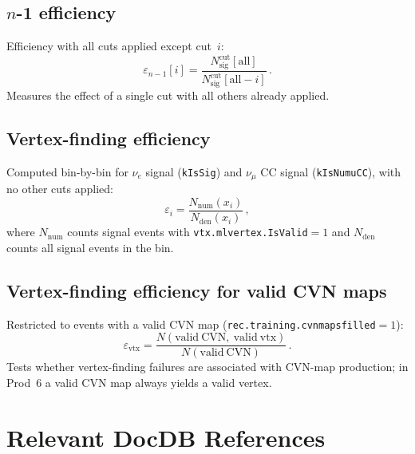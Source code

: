 \documentclass{article}
\begin{document}
\subsection{$n$-1 efficiency}
\label{app:nminus1}

Efficiency with all cuts applied except cut~$i$:
\begin{equation}
    \varepsilon_{n-1}[i] = \frac{N_\mathrm{sig}^\mathrm{cut}[\mathrm{all}]}{N_\mathrm{sig}^\mathrm{cut}[\mathrm{all}-i]}\,.
    \label{eq:nminus1-eff}
\end{equation}
\noindent Measures the effect of a single cut with all others already applied.

\subsection{Vertex-finding efficiency}
\label{app:vtx-eff}

Computed bin-by-bin for $\nu_e$ signal (\texttt{kIsSig}) and $\nu_{\mu}$ CC signal (\texttt{kIsNumuCC}), with no other cuts applied:
\begin{equation}
    \varepsilon_i = \frac{N_\mathrm{num}(x_i)}{N_\mathrm{den}(x_i)}\,,
    \label{eq:vtx-eff}
\end{equation}
where $N_\mathrm{num}$ counts signal events with \texttt{vtx.mlvertex.IsValid}$=1$ and $N_\mathrm{den}$ counts all signal events in the bin.

\subsection{Vertex-finding efficiency for valid CVN maps}
\label{app:cvn-vtx-eff}

Restricted to events with a valid CVN map (\texttt{rec.training.cvnmapsfilled}$=1$):
\begin{equation}
    \varepsilon_\mathrm{vtx} = \frac{N(\mathrm{valid\ CVN,\ valid\ vtx})}{N(\mathrm{valid\ CVN})}\,.
    \label{eq:cvn-vtx-eff}
\end{equation}
\noindent Tests whether vertex-finding failures are associated with CVN-map production; in Prod~6 a valid CVN map always yields a valid vertex.

\section{Relevant DocDB References}
\end{document}
